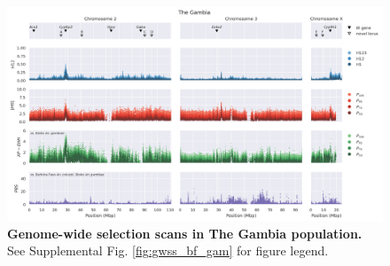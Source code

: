 \documentclass[a4paper,11pt,abstracton,hidelinks]{scrartcl}
\begin{document}
\begin{landscape}
\begin{figure}[t!]
	\begin{center}
		\includegraphics*[width=1\linewidth,center]{artwork/gwss_gm_gq_gam_bf_col_gq_gam.png}
	\end{center}
	\caption{
	\textbf{Genome-wide selection scans in The Gambia population.} 
	See Supplemental Fig. \ref{fig:gwss_bf_gam} for figure legend.
	} 
	\label{fig:gwss_gm}
\end{figure}


\end{landscape}

\clearpage
\end{document}

